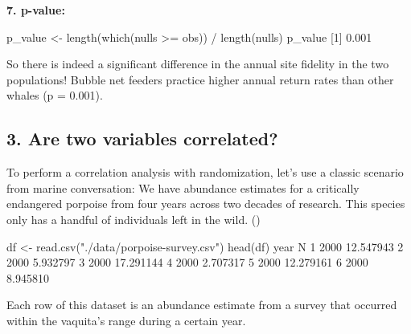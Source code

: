 \documentclass[
]{book}
\newenvironment{Shaded}{\begin{snugshade}}{\end{snugshade}}
\newcommand{\AttributeTok}[1]{\textcolor[rgb]{0.77,0.63,0.00}{#1}}
\newcommand{\DecValTok}[1]{\textcolor[rgb]{0.00,0.00,0.81}{#1}}
\newcommand{\FloatTok}[1]{\textcolor[rgb]{0.00,0.00,0.81}{#1}}
\newcommand{\FunctionTok}[1]{\textcolor[rgb]{0.00,0.00,0.00}{#1}}
\newcommand{\NormalTok}[1]{#1}
\newcommand{\OtherTok}[1]{\textcolor[rgb]{0.56,0.35,0.01}{#1}}
\newcommand{\SpecialCharTok}[1]{\textcolor[rgb]{0.00,0.00,0.00}{#1}}
\newcommand{\StringTok}[1]{\textcolor[rgb]{0.31,0.60,0.02}{#1}}
\begin{document}
\textbf{7. p-value:}

\begin{Shaded}
\begin{Highlighting}[]
\NormalTok{p\_value }\OtherTok{\textless{}{-}} \FunctionTok{length}\NormalTok{(}\FunctionTok{which}\NormalTok{(nulls }\SpecialCharTok{\textgreater{}=}\NormalTok{ obs)) }\SpecialCharTok{/} \FunctionTok{length}\NormalTok{(nulls)}
\NormalTok{p\_value}
\NormalTok{[}\DecValTok{1}\NormalTok{] }\FloatTok{0.001}
\end{Highlighting}
\end{Shaded}

So there is indeed a significant difference in the annual site fidelity in the two populations! Bubble net feeders practice higher annual return rates than other whales (p = 0.001).

\hypertarget{are-two-variables-correlated}{%
\subsection*{3. Are two variables correlated?}\label{are-two-variables-correlated}}

To perform a correlation analysis with randomization, let's use a classic scenario from marine conversation: We have abundance estimates for a critically endangered porpoise from four years across two decades of research. This species only has a handful of individuals left in the wild. ()

\begin{Shaded}
\begin{Highlighting}[]
\NormalTok{df }\OtherTok{\textless{}{-}} \FunctionTok{read.csv}\NormalTok{(}\StringTok{"./data/porpoise{-}survey.csv"}\NormalTok{)}
\FunctionTok{head}\NormalTok{(df)}
\NormalTok{  year         N}
\DecValTok{1} \DecValTok{2000} \FloatTok{12.547943}
\DecValTok{2} \DecValTok{2000}  \FloatTok{5.932797}
\DecValTok{3} \DecValTok{2000} \FloatTok{17.291144}
\DecValTok{4} \DecValTok{2000}  \FloatTok{2.707317}
\DecValTok{5} \DecValTok{2000} \FloatTok{12.279161}
\DecValTok{6} \DecValTok{2000}  \FloatTok{8.945810}
\end{Highlighting}
\end{Shaded}

Each row of this dataset is an abundance estimate from a survey that occurred within the vaquita's range during a certain year.

\begin{Shaded}
\end{Shaded}
\end{document}

